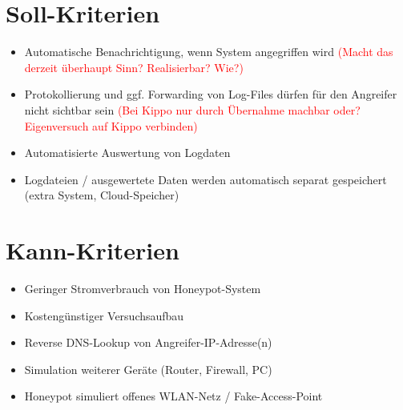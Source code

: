 \section{Soll-Kriterien}
\label{sec:Soll-Kriterien}
\begin{itemize}
\item Automatische Benachrichtigung, wenn System angegriffen wird \textcolor{red}{(Macht das derzeit überhaupt Sinn? Realisierbar? Wie?)}
\item Protokollierung und ggf. Forwarding von Log-Files dürfen für den Angreifer nicht sichtbar sein \textcolor{red}{(Bei Kippo nur durch Übernahme machbar oder? Eigenversuch auf Kippo verbinden)}
\item Automatisierte Auswertung von Logdaten
\item Logdateien / ausgewertete Daten werden automatisch separat gespeichert (extra System, Cloud-Speicher)
\end{itemize}


\section{Kann-Kriterien}
\label{sec:Kann-Kriterien}
\begin{itemize}
\item Geringer Stromverbrauch von Honeypot-System
\item Kostengünstiger Versuchsaufbau
\item Reverse DNS-Lookup von Angreifer-IP-Adresse(n)
\item Simulation weiterer Geräte (Router, Firewall, PC)
\item Honeypot simuliert offenes WLAN-Netz / Fake-Access-Point
\end{itemize}


